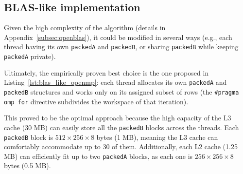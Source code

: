 \subsection{BLAS-like implementation}
Given the high complexity of the algorithm (details in Appendix~\ref{subsec:openblas}), it could be modified in several ways (e.g., each thread having its own \texttt{packedA} and \texttt{packedB}, or sharing \texttt{packedB} while keeping \texttt{packedA} private).

Ultimately, the empirically proven best choice is the one proposed in Listing~\ref{lst:blas_like_openmp}: each thread allocates its own \texttt{packedA} and \texttt{packedB} structures and works only on its assigned subset of rows (the \texttt{\#pragma omp for} directive subdivides the workspace of that iteration).

This proved to be the optimal approach because the high capacity of the L3 cache (30 MB) can easily store all the \texttt{packedB} blocks across the threads. Each \texttt{packedB} block is $512 \times 256 \times 8$ bytes (1 MB), meaning the L3 cache can comfortably accommodate up to 30 of them. Additionally, each L2 cache (1.25 MB) can efficiently fit up to two \texttt{packedA} blocks, as each one is $256 \times 256 \times 8$ bytes (0.5 MB).

